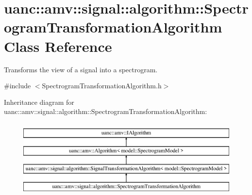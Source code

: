 \hypertarget{classuanc_1_1amv_1_1signal_1_1algorithm_1_1_spectrogram_transformation_algorithm}{}\section{uanc\+:\+:amv\+:\+:signal\+:\+:algorithm\+:\+:Spectrogram\+Transformation\+Algorithm Class Reference}
\label{classuanc_1_1amv_1_1signal_1_1algorithm_1_1_spectrogram_transformation_algorithm}


Transforms the view of a signal into a spectrogram.  




{\ttfamily \#include $<$Spectrogram\+Transformation\+Algorithm.\+h$>$}

Inheritance diagram for uanc\+:\+:amv\+:\+:signal\+:\+:algorithm\+:\+:Spectrogram\+Transformation\+Algorithm\+:\begin{figure}[H]
\begin{center}
\leavevmode
\includegraphics[height=4.000000cm]{classuanc_1_1amv_1_1signal_1_1algorithm_1_1_spectrogram_transformation_algorithm}
\end{center}
\end{figure}
